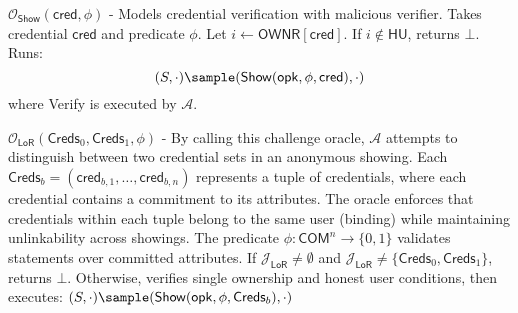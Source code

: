 \noindent  $\mathcal{O}_{\mathsf{Show}}(\mathsf{cred}, \phi)$ - Models credential verification with malicious verifier. Takes credential $\mathsf{cred}$ and predicate $\phi$. Let $i \gets \mathsf{OWNR}[\mathsf{cred}]$. If $i \notin \mathsf{HU}$, returns $\bot$. Runs:
\[
(S, \cdot) \sample (\mathsf{Show}(\mathsf{opk}, \phi, \mathsf{cred}), \cdot)
\]
where Verify is executed by $\mathcal{A}$.

\noindent $\mathcal{O}_{\mathsf{LoR}}(\mathsf{Creds}_0, \mathsf{Creds}_1, \phi)$ - By calling this challenge oracle, $\mathcal{A}$ attempts to distinguish between two credential sets in an anonymous showing. Each $\mathsf{Creds}_b = (\mathsf{cred}_{b,1},\ldots,\mathsf{cred}_{b,n})$ represents a tuple of credentials, where each credential contains a commitment to its attributes. The oracle enforces that credentials within each tuple belong to the same user (binding) while maintaining unlinkability across showings. The predicate $\phi: \mathsf{COM}^n \rightarrow \{0,1\}$ validates statements over committed attributes. If $\mathcal{J}_{\mathsf{LoR}} \neq \emptyset$ and $\mathcal{J}_{\mathsf{LoR}} \neq \{\mathsf{Creds}_0, \mathsf{Creds}_1\}$, returns $\bot$. Otherwise, verifies single ownership and honest user conditions, then executes:
$(S, \cdot) \sample (\mathsf{Show}(\mathsf{opk}, \phi, \mathsf{Creds}_b), \cdot)$


